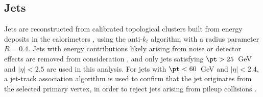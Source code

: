 

\subsection{Jets}
\label{subsec:jets}
Jets are reconstructed from calibrated topological clusters built from energy deposits in the calorimeters \cite{ATL-PHYS-PUB-2015-015}, using the anti-$k_t$ algorithm with a radius parameter $R=0.4$.  Jets with energy contributions likely arising from noise or detector effects are removed from consideration \cite{ATLAS-CONF-2015-029}, and only jets satisfying $\pt > 25$~GeV and $|\eta| < 2.5$ are used in this analysis.  For jets with $\pt < 60$~GeV and $|\eta| < 2.4$, a jet-track association algorithm is used to confirm that the jet originates from the selected primary vertex, in order to reject jets arising from pileup collisions \cite{PERF-2014-03}.


